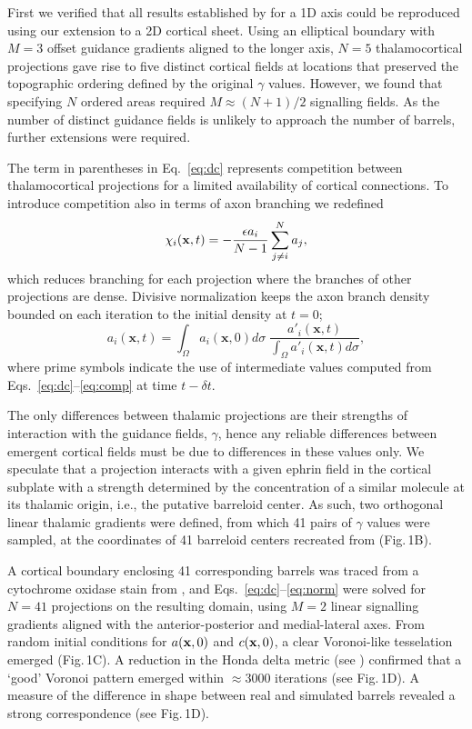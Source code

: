 \documentclass[9pt,twocolumn,twoside,lineno]{pnas-new}
\begin{document}
First we verified that all results established by \cite{karbowski_model_2004} for a 1D axis could be reproduced using our extension to a 2D cortical sheet. Using an elliptical boundary with $M=3$ offset guidance gradients aligned to the longer axis, $N=5$ thalamocortical projections gave rise to five distinct cortical fields at locations that preserved the topographic ordering defined by the original $\gamma$ values. However, we found that specifying $N$ ordered areas required $M\approx (N+1)/2$ signalling fields. As the number of distinct guidance fields is unlikely to approach the number of barrels, further extensions were required.

The term in parentheses in Eq.~\ref{eq:dc} represents competition between thalamocortical projections for a limited availability of cortical connections. To introduce competition also in terms of axon branching we redefined
%
\begin{equation} \label{eq:comp}
\chi_i(\mathbf{x}, t) = - \frac{\epsilon  a_i}{N-1} \sum_{j \ne i}^{N} a_{j},
\end{equation}
%
which reduces branching for each projection where the branches of other projections are dense. Divisive normalization keeps the axon branch density bounded on each iteration to the initial density  at $t=0$;
%
\begin{equation} \label{eq:norm}
  a_i(\mathbf{x}, t) = \int_\Omega  a_i(\mathbf{x}, 0) d\sigma \; \frac {a'_i(\mathbf{x}, t)} {\int_\Omega
  a'_i(\mathbf{x}, t) d\sigma},
\end{equation}
%
where prime symbols indicate the use of intermediate values computed from Eqs.~\ref{eq:dc}--\ref{eq:comp} at time $t-{\delta}t$.

The only differences between thalamic projections are their strengths of interaction with the guidance fields, $\gamma$, hence any reliable differences between emergent cortical fields must be due to differences in these values only. We speculate that a projection interacts with a given ephrin field in the cortical subplate with a strength determined by the concentration of a similar molecule at its thalamic origin, i.e., the putative barreloid center. As such, two orthogonal linear thalamic gradients were defined, from which 41 pairs of $\gamma$ values were sampled, at the coordinates of 41 barreloid centers recreated from \cite{haidarliu_size_2001} (Fig.\,1B).

A cortical boundary enclosing 41 corresponding barrels was traced from a cytochrome oxidase stain from \cite{zheng_signal_2001}, and Eqs.~\ref{eq:dc}--\ref{eq:norm} were solved for $N=41$ projections on the resulting domain, using $M=2$ linear signalling gradients aligned with the anterior-posterior and medial-lateral axes. From random initial conditions for $a({\bf x},0)$ and $c({\bf x},0)$, a clear Voronoi-like tesselation emerged (Fig.\,1C). A reduction in the Honda delta metric (see \cite{senft_mouse_1991}) confirmed that a `good' Voronoi pattern emerged within $\approx 3000$ iterations (see Fig.\,1D). A measure of the difference in shape between real and simulated barrels revealed a strong correspondence (see Fig.\,1D).
\end{document}
